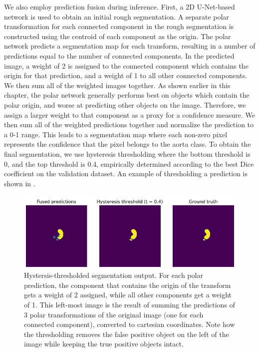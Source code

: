 We also employ prediction fusion during inference. First, a 2D U-Net-based network is used to obtain an initial rough segmentation. A separate polar transformation for each connected component in the rough segmentation is constructed using the centroid of each component as the origin. The polar network predicts a segmentation map for each transform, resulting in a number of predictions equal to the number of connected components. In the predicted image, a weight of 2 is assigned to the connected component which contains the origin for that prediction, and a weight of 1 to all other connected components. We then sum all of the weighted images together. As shown earlier in this chapter, the polar network generally performs best on objects which contain the polar origin, and worse at predicting other objects on the image. Therefore, we assign a larger weight to that component as a proxy for a confidence measure. We then sum all of the weighted predictions together and normalize the prediction to a 0-1 range. This leads to a segmentation map where each non-zero pixel represents the confidence that the pixel belongs to the aorta class. To obtain the final segmentation, we use hysteresis thresholding where the bottom threshold is 0, and the top threshold is 0.4, empirically determined according to the best Dice coefficient on the validation dataset. An example of thresholding a prediction is shown in .

\begin{figure}[h]
\centering
\includegraphics[width=0.8\columnwidth]{images/4/hyst}
\caption{Hystersis-thresholded segmentation output. For each polar prediction, the component that contains the origin of the transform gets a weight of 2 assigned, while all other components get a weight of 1. This left-most image is the result of summing the predictions of 3 polar transformations of the original image (one for each connected component), converted to cartesian coordinates. Note how the thresholding removes the false positive object on the left of the image while keeping the true positive objects intact. \cite{bencevicUsingPolarTransform2022a}}
\label{fig:thresh}
\end{figure}

